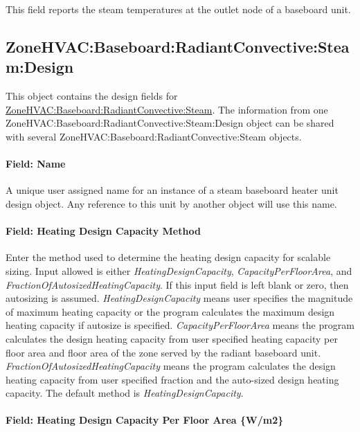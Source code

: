 This field reports the steam temperatures at the outlet node of a baseboard unit.

\subsection{ZoneHVAC:Baseboard:RadiantConvective:Steam:Design}\label{zonehvac-baseboard-radiantconvective-steam-design}

This object contains the design fields for \hyperref[zonehvacbaseboardradiantconvectivesteam] {ZoneHVAC:Baseboard:RadiantConvective:Steam}. The information from one ZoneHVAC:Baseboard:RadiantConvective:Steam:Design object can be shared with several ZoneHVAC:Baseboard:RadiantConvective:Steam objects.

\paragraph{Field: Name}\label{steam-baseboard-design-name}

A unique user assigned name for an instance of a steam baseboard heater unit design object. Any reference to this unit by another object will use this name.

\paragraph{Field: Heating Design Capacity Method}\label{field-heating-design-capacity-method-1-000}

Enter the method used to determine the heating design capacity for scalable sizing. Input allowed is either \emph{HeatingDesignCapacity}, \emph{CapacityPerFloorArea}, and \emph{FractionOfAutosizedHeatingCapacity}. If this input field is left blank or zero, then autosizing is assumed. \emph{HeatingDesignCapacity} means user specifies the magnitude of maximum heating capacity or the program calculates the maximum design heating capacity if autosize is specified. \emph{CapacityPerFloorArea} means the program calculates the design heating capacity from user specified heating capacity per floor area and floor area of the zone served by the radiant baseboard unit. \emph{FractionOfAutosizedHeatingCapacity} means the program calculates the design heating capacity from user specified fraction and the auto-sized design heating capacity. The default method is \emph{HeatingDesignCapacity}.

\paragraph{Field: Heating Design Capacity Per Floor Area \{W/m2\}}\label{field-heating-design-capacity-per-floor-area-wm2-1-000}

